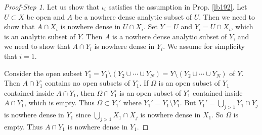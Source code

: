 \documentclass[12pt,b5paper,notitlepage]{report}
\theoremstyle{definition}
\theoremstyle{plain}
\numberwithin{equation}{section}
\begin{document}
\begin{proof}[Proof-Step 1]
Let us show that $\iota_i$ satisfies the assumption in Prop. \ref{lb192}. Let $U\subset X$ be open and $A$ be a nowhere dense analytic subset of $U$. Then we need to show that $A\cap X_i$ is nowhere dense in $U\cap X_i$. Set $Y=U$ and $Y_i=U\cap X_i$, which is an analytic subset of $Y$. Then $A$ is a nowhere dense analytic subset of $Y$, and we need to show that $A\cap Y_i$ is nowhere dense in $Y_i$. We assume for simplicity that $i=1$.


Consider the open subset $Y_1^\circ=Y_1\setminus(Y_2\cup\cdots\cup Y_N)=Y\setminus(Y_2\cup\cdots\cup Y_N)$ of $Y$. Then $A\cap Y_1^\circ$ contains no open subsets of $Y_1^\circ$. If $\Omega$ is an open subset of $Y_1$ contained inside $A\cap Y_1$, then $\Omega\cap Y_1^\circ$ is an open subset of $Y_1^\circ$ contained inside $A\cap Y_1^\circ$, which is empty. Thus $\Omega\subset Y_1'$ where $Y_1'=Y_1\setminus Y_1^\circ$. But $Y_1'=\bigcup_{j>1}Y_1\cap Y_j$ is nowhere dense in $Y_1$ since $\bigcup_{j>1}X_1\cap X_j$ is nowhere dense in $X_1$. So $\Omega$ is empty. Thus $A\cap Y_1$ is nowhere dense in $Y_1$.
\end{proof}
\end{document}
